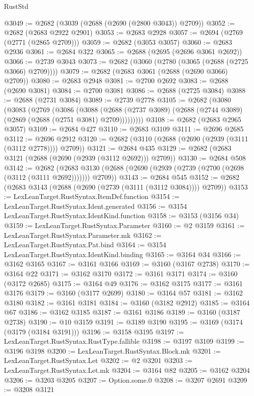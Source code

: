 \begin{lexlean}{RustStd}
\begin{coremodule}
@3049 := @2682 (@3039 (@2688 (@2690 (@2800 @3043)) @2709))
@3052 := @2682 (@2683 @2922 @2901)
@3053 := @2683 @2928
@3057 := @2694 (@2769 (@2771 (@2865 @2709)))
@3059 := @2682 (@3053 @3057)
@3060 := @2683 @2936
@3061 := @2684 @322
@3065 := @2688 (@2695 (@2696 @3061 @2692))
@3066 := @2739 @3043
@3073 := @2682 (@3060 (@2780 (@3065 (@2688 (@2725 @3066) @2709))))
@3079 := @2682 (@2683 @3061 (@2688 (@2690 @3066) @2709))
@3080 := @2683 @2948
@3081 := @2700 @2692
@3083 := @2688 (@2690 @3081)
@3084 := @2700 @3081
@3086 := @2688 (@2725 @3084)
@3088 := @2688 (@2731 @3084)
@3089 := @2739 @2778
@3105 := @2682
    (@3080
      (@3083
        (@2769
          (@3086
            (@3088
              (@2688 (@2737 @3089) (@2688 (@2744 @3089) (@2869 (@2688 (@2751 @3081) @2709)))))))))
@3108 := @2682 (@2683 @2965 @3057)
@3109 := @2684 @427
@3110 := @2683 @3109
@3111 := @2696 @2685
@3112 := @2696 @2912
@3120 := @2682 (@3110 (@2688 (@2690 (@2939 (@3111 (@3112 @2778)))) @2709))
@3121 := @2684 @435
@3129 := @2682 (@2683 @3121 (@2688 (@2690 (@2939 (@3112 @2692))) @2709))
@3130 := @2684 @508
@3142 := @2682
    (@2683 @3130 (@2688 (@2690 (@2939 (@2739 (@2700 (@2698 (@3112 (@3111 @2692))))))) @2709))
@3143 := @2684 @545
@3152 := @2682 (@2683 @3143 (@2688 (@2690 (@2739 (@3111 (@3112 @3084)))) @2709))
@3153 := LexLeanTarget.RustSyntax.ItemDef.function
@3154 := LexLeanTarget.RustSyntax.Ident.generated
@3156 := @3154 LexLeanTarget.RustSyntax.IdentKind.function
@3158 := @3153 (@3156 @34)
@3159 := LexLeanTarget.RustSyntax.Parameter
@3160 := @2 @3159
@3161 := LexLeanTarget.RustSyntax.Parameter.mk
@3162 := LexLeanTarget.RustSyntax.Pat.bind
@3164 := @3154 LexLeanTarget.RustSyntax.IdentKind.binding
@3165 := @3164 @34
@3166 := @3162 @3165
@3167 := @3161 @3166
@3169 := @3160 (@3167 @2738)
@3170 := @3164 @22
@3171 := @3162 @3170
@3172 := @3161 @3171
@3174 := @3160 (@3172 @2685)
@3175 := @3164 @49
@3176 := @3162 @3175
@3177 := @3161 @3176
@3179 := @3160 (@3177 @2699)
@3180 := @3164 @57
@3181 := @3162 @3180
@3182 := @3161 @3181
@3184 := @3160 (@3182 @2912)
@3185 := @3164 @67
@3186 := @3162 @3185
@3187 := @3161 @3186
@3189 := @3160 (@3187 @2738)
@3190 := @10 @3159
@3191 := @3189 @3190
@3195 := @3169 (@3174 (@3179 (@3184 @3191)))
@3196 := @3158 @3195
@3197 := LexLeanTarget.RustSyntax.RustType.fallible
@3198 := @3197 @3109
@3199 := @3196 @3198
@3200 := LexLeanTarget.RustSyntax.Block.mk
@3201 := LexLeanTarget.RustSyntax.Let
@3202 := @2 @3201
@3203 := LexLeanTarget.RustSyntax.Let.mk
@3204 := @3164 @82
@3205 := @3162 @3204
@3206 := @3203 @3205
@3207 := Option.some.{0}
@3208 := @3207 @2691
@3209 := @3208 @3121

\end{coremodule}
\end{lexlean}
